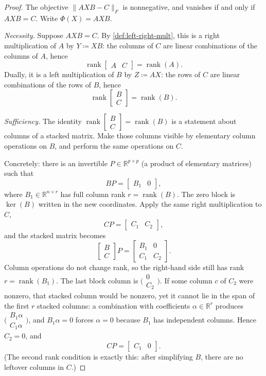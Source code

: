 \documentclass[11pt,a4paper]{article}
\DeclareMathOperator{\rank}{rank}
\begin{document}
\begin{proof}
The objective \(\|AXB-C\|_{F}\) is nonnegative, and vanishes if and only if \(AXB=C\). Write \(\Phi(X)=AXB\).

\emph{Necessity.}
Suppose \(AXB=C\). By \cref{def:left-right-mult}, this is a right multiplication of \(A\) by \(Y\coloneqq XB\): the columns of \(C\) are linear combinations of the columns of \(A\), hence
\[
\rank\begin{bmatrix} A & C \end{bmatrix}
=
\rank(A).
\]
Dually, it is a left multiplication of \(B\) by \(Z\coloneqq AX\): the rows of \(C\) are linear combinations of the rows of \(B\), hence
\[
\rank\begin{bmatrix} B \\ C \end{bmatrix}
=
\rank(B).
\]

\emph{Sufficiency.}
The identity \(\rank\begin{bmatrix} B \\ C \end{bmatrix}=\rank(B)\) is a statement about columns of a stacked matrix. Make those columns visible by elementary column operations on \(B\), and perform the same operations on \(C\).

Concretely: there is an invertible \(P\in\mathbb{R}^{p\times p}\) (a product of elementary matrices) such that
\[
BP
=
\begin{bmatrix} B_{1} & 0 \end{bmatrix},
\]
where \(B_{1}\in\mathbb{R}^{n\times r}\) has full column rank \(r=\rank(B)\). The zero block is \(\ker(B)\) written in the new coordinates. Apply the same right multiplication to \(C\),
\[
CP
=
\begin{bmatrix} C_{1} & C_{2} \end{bmatrix},
\]
and the stacked matrix becomes
\[
\begin{bmatrix} B \\ C \end{bmatrix}P
=
\begin{bmatrix} B_{1} & 0 \\ C_{1} & C_{2} \end{bmatrix}.
\]
Column operations do not change rank, so the right-hand side still has rank \(r=\rank(B_{1})\). The last block column is \(\bigl(\begin{smallmatrix}0\\ C_{2}\end{smallmatrix}\bigr)\). If some column \(c\) of \(C_{2}\) were nonzero, that stacked column would be nonzero, yet it cannot lie in the span of the first \(r\) stacked columns: a combination with coefficients \(\alpha\in\mathbb{R}^{r}\) produces \(\bigl(\begin{smallmatrix}B_{1}\alpha\\ C_{1}\alpha\end{smallmatrix}\bigr)\), and \(B_{1}\alpha=0\) forces \(\alpha=0\) because \(B_{1}\) has independent columns. Hence \(C_{2}=0\), and
\[
CP
=
\begin{bmatrix} C_{1} & 0 \end{bmatrix}.
\]
(The second rank condition is exactly this: after simplifying \(B\), there are no leftover columns in \(C\).)


\end{proof}
\end{document}
